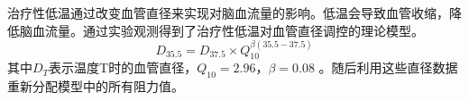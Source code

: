 \documentclass[12pt,a4paper]{article} %
\begin{document}
治疗性低温通过改变血管直径来实现对脑血流量的影响。低温会导致血管收缩，降低脑血流量。通过实验观测得到了治疗性低温对血管直径调控的理论模型\cite{josephUsingHumanCirculation2022,konstasTheoreticalModelSelective2007}。
\begin{equation*}
    D_{35.5} = D_{37.5} \times Q_{10}^{\beta(35.5-37.5)}
\end{equation*}
其中$D_T$表示温度T时的血管直径，$Q_{10} = 2.96$，$\beta = 0.08$ \cite{josephUsingHumanCirculation2022}。随后利用这些直径数据重新分配模型中的所有阻力值。


\end{document}
